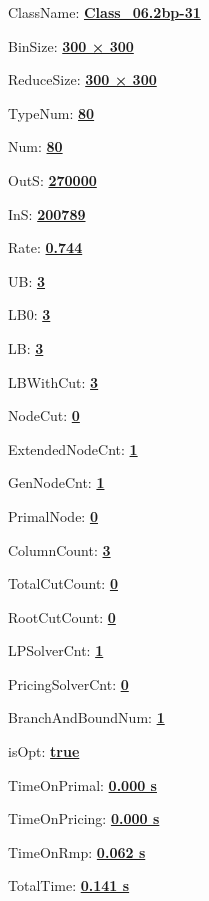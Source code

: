 \documentclass[11pt]{article}
\begin{document}
\pagestyle{empty}


ClassName: \underline{\textbf{Class_06.2bp-31}}
\par
BinSize: \underline{\textbf{300 × 300}}
\par
ReduceSize: \underline{\textbf{300 × 300}}
\par
TypeNum: \underline{\textbf{80}}
\par
Num: \underline{\textbf{80}}
\par
OutS: \underline{\textbf{270000}}
\par
InS: \underline{\textbf{200789}}
\par
Rate: \underline{\textbf{0.744}}
\par
UB: \underline{\textbf{3}}
\par
LB0: \underline{\textbf{3}}
\par
LB: \underline{\textbf{3}}
\par
LBWithCut: \underline{\textbf{3}}
\par
NodeCut: \underline{\textbf{0}}
\par
ExtendedNodeCnt: \underline{\textbf{1}}
\par
GenNodeCnt: \underline{\textbf{1}}
\par
PrimalNode: \underline{\textbf{0}}
\par
ColumnCount: \underline{\textbf{3}}
\par
TotalCutCount: \underline{\textbf{0}}
\par
RootCutCount: \underline{\textbf{0}}
\par
LPSolverCnt: \underline{\textbf{1}}
\par
PricingSolverCnt: \underline{\textbf{0}}
\par
BranchAndBoundNum: \underline{\textbf{1}}
\par
isOpt: \underline{\textbf{true}}
\par
TimeOnPrimal: \underline{\textbf{0.000 s}}
\par
TimeOnPricing: \underline{\textbf{0.000 s}}
\par
TimeOnRmp: \underline{\textbf{0.062 s}}
\par
TotalTime: \underline{\textbf{0.141 s}}
\par
\newpage
\end{document}
